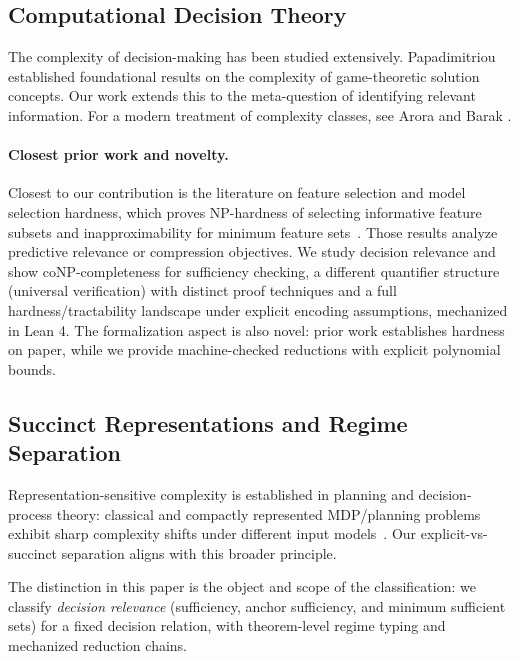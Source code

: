 \subsection{Computational Decision Theory}

The complexity of decision-making has been studied extensively. Papadimitriou~\cite{papadimitriou1994complexity} established foundational results on the complexity of game-theoretic solution concepts. Our work extends this to the meta-question of identifying relevant information. For a modern treatment of complexity classes, see Arora and Barak \cite{arora2009computational}.

\paragraph{Closest prior work and novelty.}
Closest to our contribution is the literature on feature selection and model selection hardness, which proves NP-hardness of selecting informative feature subsets and inapproximability for minimum feature sets~\cite{blum1997selection, amaldi1998complexity}. Those results analyze predictive relevance or compression objectives. We study decision relevance and show coNP-completeness for sufficiency checking, a different quantifier structure (universal verification) with distinct proof techniques and a full hardness/tractability landscape under explicit encoding assumptions, mechanized in Lean 4. The formalization aspect is also novel: prior work establishes hardness on paper, while we provide machine-checked reductions with explicit polynomial bounds.

\subsection{Succinct Representations and Regime Separation}

Representation-sensitive complexity is established in planning and decision-process theory: classical and compactly represented MDP/planning problems exhibit sharp complexity shifts under different input models~\cite{papadimitriou1987mdp,mundhenk2000mdp,littman1998probplanning}. Our explicit-vs-succinct separation aligns with this broader principle.

The distinction in this paper is the object and scope of the classification: we classify \emph{decision relevance} (sufficiency, anchor sufficiency, and minimum sufficient sets) for a fixed decision relation, with theorem-level regime typing and mechanized reduction chains.

